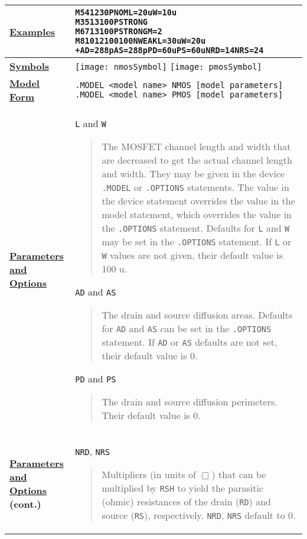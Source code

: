 \begin{longtable}[Hh]{>{\setlength{\hsize}{.4\hsize}}YY}
\underline{\bf Examples} &
\begin{alltt}
M5 4 12 3 0 PNOM L=20u W=10u
M3 5 13 10 0 PSTRONG
M6 7 13 10 0 PSTRONG M=2
M8 10 12 100 100 NWEAK L=30u W=20u
+ AD=288p AS=288p PD=60u PS=60u NRD=14 NRS=24
\end{alltt} \\ \hline

\underline{\bf Symbols} &
{\texttt{[image: nmosSymbol]}}
{\texttt{[image: pmosSymbol]}}
\\ \hline

\underline{\bf Model Form} &
\verb|.MODEL <model name> NMOS [model parameters]|
\verb|.MODEL <model name> PMOS [model parameters]|\\ \hline

\underline{\bf Parameters} \underline{\bf and Options} &
\texttt{L} and \texttt{W}
\begin{quote}
  The MOSFET channel length and width that are decreased to get the actual
  channel length and width. They may be given in the device \texttt{.MODEL} or
  \texttt{.OPTIONS} statements. The value in the device statement overrides the
  value in the model statement, which overrides the value in the
  \texttt{.OPTIONS} statement. Defaults for \texttt{L} and \texttt{W} may be
  set in the \texttt{.OPTIONS} statement. If \texttt{L} or \texttt{W} values
  are not given, their default value is 100 u.
\end{quote}
\texttt{AD} and \texttt{AS}
\begin{quote}
  The drain and source diffusion areas. Defaults for \texttt{AD} and
  \texttt{AS} can be set in the \texttt{.OPTIONS} statement.  If \texttt{AD} or
  \texttt{AS} defaults are not set, their default value is 0.
\end{quote}
\texttt{PD} and \texttt{PS}
\begin{quote}
  The drain and source diffusion perimeters. Their default value is 0.
\end{quote}
\\ \hline
\underline{\bf Parameters} \underline{\bf and Options} \bf (cont.) &
\texttt{NRD}, \texttt{NRS} 
\begin{quote}
  Multipliers (in units of $\Box$) that can be multiplied by \texttt{RSH}
  to yield the parasitic (ohmic) resistances of the drain (\texttt{RD})
  and source (\texttt{RS}), respectively.  \texttt{NRD}, \texttt{NRS}
  default to 0.


\end{quote}
\end{longtable}
